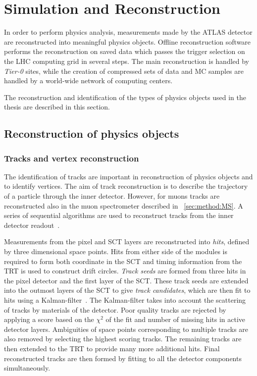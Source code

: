 \chapter{Simulation and Reconstruction}\label{chap:SimReco}
In order to perform physics analysis, measurements made by the ATLAS detector are reconstructed into meaningful physics objects. Offline reconstruction software performs the reconstruction on saved data which passes the trigger selection on the LHC computing grid in several steps. The main reconstruction is handled by \emph{Tier-0} sites, while the creation of compressed sets of data and MC samples are handled by a world-wide network of computing centers.

The reconstruction and identification of the types of physics objects used in the thesis are described in this section. 
\section{Reconstruction of physics objects}

\subsection{Tracks and vertex reconstruction}\label{sec:reconstruction:tracks}
The identification of tracks are important in reconstruction of physics objects and to identify vertices. The aim of track reconstruction is to describe the trajectory of a particle through the inner detector. However, for muons tracks are reconstructed also in the muon spectrometer described in ~\cref{sec:method:MS}. A series of sequential algorithms are used to reconstruct tracks from the inner detector readout~\cite{ATLAS:tracking}. 

Measurements from the pixel and SCT layers are reconstructed into \emph{hits}, defined by three dimensional space points. Hits from either side of the modules is required to form both coordinate in the SCT and timing information from the TRT is used to construct drift circles. \emph{Track seeds} are formed from three hits in the pixel detector and the first layer of the SCT. These track seeds are extended into the outmost layers of the SCT to give \emph{track candidates}, which are then fit to hits using a Kalman-filter~\cite{ATLAS:tracking,ATLAS:Kalman}. The Kalman-filter takes into account the scattering of tracks by materials of the detector. Poor quality tracks are rejected by applying a score based on the $\chi^2$ of the fit and number of missing hits in active detector layers. Ambiguities of space points corresponding to multiple tracks are also removed by selecting the highest scoring tracks. The remaining tracks are then extended to the TRT to provide many more additional hits. Final reconstructed tracks are then formed by fitting to all the detector components simultaneously. 

